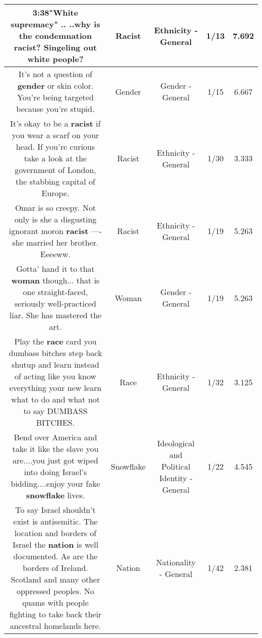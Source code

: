 \documentclass[11pt]{article}
\newlength\mylength
\begin{document}
\begin{center}
\begin{longtable}{|C{.65\mylength}|C{.30\mylength}|C{.12\mylength}|C{.12\mylength}|C{.12\mylength}|}
  \small 3:38"White supremacy" .. ..why is the condemnation \textbf{racist}? Singeling out white people?\normalsize   & Racist & Ethnicity - General & 1/13 & 7.692 \\  \hline
  \small It's not a question of \textbf{gender} or skin color. You're being targeted because you're stupid.\normalsize   & Gender & Gender - General & 1/15 & 6.667 \\  \hline
  \small It's okay to be a \textbf{racist} if you wear a scarf on your head.  If you're curious take a look at the government of London, the stabbing capital of Europe.\normalsize   & Racist & Ethnicity - General & 1/30 & 3.333 \\  \hline
  \small Omar is so creepy. Not only is she a disgusting ignorant moron \textbf{racist} —- she married her brother. Eeeeww.\normalsize   & Racist & Ethnicity - General & 1/19 & 5.263 \\  \hline
  \small Gotta' hand it to that \textbf{woman} though... that is one straight-faced, seriously well-practiced liar.  She has mastered the art.\normalsize   & Woman & Gender - General & 1/19 & 5.263 \\  \hline
  \small Play the \textbf{race} card you dumbass bitches step back shutup and learn instead of acting like you know everything your new learn what to do and what not to say DUMBASS BITCHES.\normalsize   & Race & Ethnicity - General & 1/32 & 3.125 \\  \hline
  \small Bend over America and take it like the slave you are....you just got wiped into doing Israel's bidding....enjoy your fake \textbf{snowflake} lives.\normalsize   & Snowflake &  Ideological and Political Identity - General & 1/22 & 4.545 \\  \hline
  \small To say Israel shouldn't exist is antisemitic. The location and borders of Israel the \textbf{nation} is well documented.  As are the borders of Ireland.  Scotland and many other oppressed peoples. No quams with people fighting to take back their ancestral homelands here.\normalsize   & Nation & Nationality - General & 1/42 & 2.381 \\  \hline

\end{longtable}
\end{center}
\end{document}
